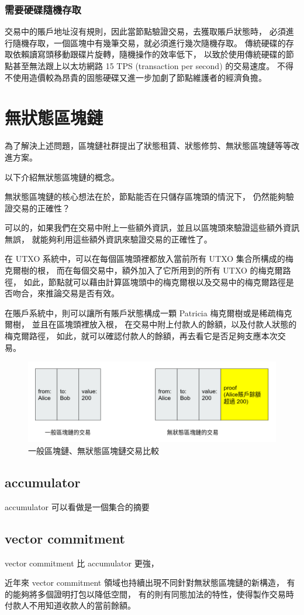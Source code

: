 \subsubsection{需要硬碟隨機存取}
交易中的賬戶地址沒有規則，因此當節點驗證交易，去獲取賬戶狀態時，
必須進行隨機存取，一個區塊中有幾筆交易，就必須進行幾次隨機存取。
傳統硬碟的存取依賴讀寫頭移動跟碟片旋轉，隨機操作的效率低下，
以致於使用傳統硬碟的節點甚至無法跟上以太坊網路 15 TPS (transaction per second) 的交易速度。
不得不使用造價較為昂貴的固態硬碟又進一步加劇了節點維護者的經濟負擔。

\section{無狀態區塊鏈}
為了解決上述問題，區塊鏈社群提出了狀態租賃、狀態修剪、無狀態區塊鏈等等改進方案。

以下介紹無狀態區塊鏈的概念。

無狀態區塊鏈的核心想法在於，節點能否在只儲存區塊頭的情況下，
仍然能夠驗證交易的正確性？

可以的，如果我們在交易中附上一些額外資訊，並且以區塊頭來驗證這些額外資訊無誤，
就能夠利用這些額外資訊來驗證交易的正確性了。

在 UTXO 系統中，可以在每個區塊頭裡都放入當前所有 UTXO 集合所構成的梅克爾樹的根，
而在每個交易中，額外加入了它所用到的所有 UTXO 的梅克爾路徑，
如此，節點就可以藉由計算區塊頭中的梅克爾根以及交易中的梅克爾路徑是否吻合，來推論交易是否有效。

在賬戶系統中，則可以讓所有賬戶狀態構成一顆 Patricia 梅克爾樹或是稀疏梅克爾樹，
並且在區塊頭裡放入根，
在交易中附上付款人的餘額，以及付款人狀態的梅克爾路徑，
如此，就可以確認付款人的餘額，再去看它是否足夠支應本次交易。

\begin{figure}
\includegraphics[width=\textwidth]{stateless-tx}
\caption{一般區塊鏈、無狀態區塊鏈交易比較}
\end{figure}

\subsection{accumulator}

accumulator\cite{benaloh1993one} 可以看做是一個集合的摘要

\subsection{vector commitment}

vector commitment\cite{catalano2013vector} 比 accumulator 更強，

近年來 vector commitment 領域也持續出現不同針對無狀態區塊鏈的新構造，
有的能夠將多個證明打包以降低空間\cite{boneh2019batching}，
有的則有同態加法的特性，使得製作交易時付款人不用知道收款人的當前餘額\cite{chepurnoy2018edrax}。